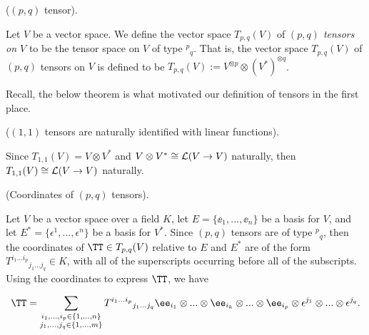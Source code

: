 \begin{defn}
    \label{ch::motivated_intro::defn::pq_tensor}
    
    ($(p, q)$ tensor).
    
    Let $V$ be a vector space. We define the vector space $T_{p,q}(V)$ of \textit{$(p, q)$ tensors on $V$} to be the tensor space on $V$ of type $^p{}_q$. That is, the vector space $T_{p,q}(V)$ of $(p, q)$ tensors on $V$ is defined to be $T_{p,q}(V) := V^{\otimes p} \otimes (V^*)^{\otimes q}$.
\end{defn}

Recall, the below theorem is what motivated our definition of tensors in the first place.

\begin{theorem}
    ($(1, 1)$ tensors are naturally identified with linear functions).
    
    Since $T_{1,1}(V) = V \otimes V^*$ and $V \otimes V^* \cong \mathcal{L}(V \rightarrow V)$ naturally, then $T_{1,1}(V) \cong \mathcal{L}(V \rightarrow V)$ naturally. 
\end{theorem}

\begin{theorem}
    (Coordinates of $(p, q)$ tensors).

    Let $V$ be a vector space over a field $K$, let $E = \{\ee_1, ..., \ee_n\}$ be a basis for $V$, and let $E^* = \{\epsilon^1, ..., \epsilon^n\}$ be a basis for $V^*$. Since $(p, q)$ tensors are of type $^p{}_q$, then the coordinates of $\TT \in T_{p,q}(V)$ relative to $E$ and $E^*$ are of the form $T^{i_1 ... i_p}{}_{j_1 ... j_q} \in K$, with all of the superscripts occurring before all of the subscripts. Using the coordinates to express $\TT$, we have

     \begin{align*}
        \TT = \sum_{\substack{i_1, ..., i_p \in \{1, ..., n\} \\ j_1, ..., j_q \in \{1, ..., m\}}} T^{i_1 ... i_p}{}_{j_1 ... j_q} \ee_{i_1} \otimes ... \otimes \ee_{i_k} \otimes ... \otimes \ee_{i_p} \otimes \epsilon^{j_1} \otimes ... \otimes \epsilon^{j_q}.
    \end{align*}
\end{theorem}

